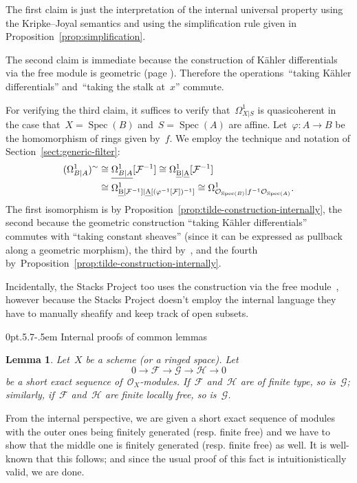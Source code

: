 \documentclass[10pt,reqno,a4paper]{amsbook}
\makeatletter
\theoremstyle{definition}
\theoremstyle{plain}
\newtheorem{lemma}[defn]{Lemma}
\theoremstyle{remark}
\newcommand{\F}{\mathcal{F}}
\newcommand{\G}{\mathcal{G}}
\renewcommand{\H}{\mathcal{H}}
\renewcommand{\O}{\mathcal{O}}
\let\oldul\ul
\renewcommand{\ul}[1]{\text{\oldul{$#1$}}}
\DeclareMathOperator{\Spec}{Spec}
\newcommand{\?}{\,{:}\,}
\renewcommand{\_}{\mathpunct{.}\,}
\newcommand{\lra}{\longrightarrow}
\newcommand{\resp}{resp.\@\xspace}
\newcommand{\stacksproject}[1]{\cite[{\href{https://stacks.math.columbia.edu/tag/#1}{Tag~#1}}]{stacks-project}}
\renewenvironment{proof}[1][\proofname]{\par
  \pushQED{\qed}%
  \normalfont \topsep6\p@\@plus6\p@\relax
  \trivlist
  \item[\hskip\labelsep
        \itshape
    #1\@addpunct{.}]\ignorespaces
}{%
  \popQED\endtrivlist\@endpefalse
}
\def\subsection{\@startsection{subsection}{2}%
  {0pt}{.5\linespacing\@plus.7\linespacing}{-.5em}%
  {\normalfont\bfseries}}
\makeatother
\begin{document}
\begin{proof}The first claim is just the interpretation of the internal
universal property using the Kripke--Joyal semantics and using the
simplification rule given in Proposition~\ref{prop:simplification}.

The second claim is immediate because the construction of Kähler differentials
via the free module is geometric (page
\pageref{page:geometric-constructions}). Therefore the operations~``taking
Kähler differentials'' and~``taking the stalk at~$x$'' commute.

For verifying the third claim, it suffices to verify that~$\Omega^1_{X|S}$ is
quasicoherent in the case that~$X = \Spec(B)$ and~$S = \Spec(A)$ are affine.
Let~$\varphi : A \to B$ be the homomorphism of rings given by~$f$. We employ the
technique and notation of Section~\ref{sect:generic-filter}:
\begin{align*}
  (\Omega^1_{B|A})^\sim &\cong
  \underline{\Omega^1_{B|A}}[\F^{-1}] \cong
  \Omega^1_{\ul{B}|\ul{A}}[\F^{-1}] \\
  &\cong
  \Omega^1_{\ul{B}[\F^{-1}]|\ul{A}[(\varphi^{-1}[\F])^{-1}]} \cong
  \Omega^1_{\O_{\Spec(B)}|f^{-1}\O_{\Spec(A)}}.
\end{align*}
The first isomorphism is by
Proposition~\ref{prop:tilde-construction-internally}, the second because the
geometric construction ``taking Kähler differentials'' commutes with ``taking
constant sheaves'' (since it can be expressed as pullback along a geometric
morphism), the third by~\stacksproject{00RT}, and the fourth
by~Proposition~\ref{prop:tilde-construction-internally}.
\end{proof}

Incidentally, the Stacks Project too uses the construction via the free
module~\stacksproject{08RL}, however because the Stacks Project doesn't employ
the internal language they have to manually sheafify and keep track of open
subsets.


\subsection{Internal proofs of common lemmas}

\begin{lemma}Let~$X$ be a scheme (or a ringed space). Let
\[ 0 \lra \F \lra \G \lra \H \lra 0 \]
be a short exact sequence of~$\O_X$-modules. If~$\F$ and~$\H$ are of finite
type, so is~$\G$; similarly, if~$\F$ and~$\H$ are finite locally free, so
is~$\G$.
\end{lemma}
\begin{proof}From the internal perspective, we are given a short exact sequence
of modules with the outer ones being finitely generated (\resp finite free)
and we have to show that the middle one is finitely generated (\resp finite
free) as well. It is well-known that this follows; and since the usual proof of
this fact is intuitionistically valid, we are done.
\end{proof}
\end{document}

